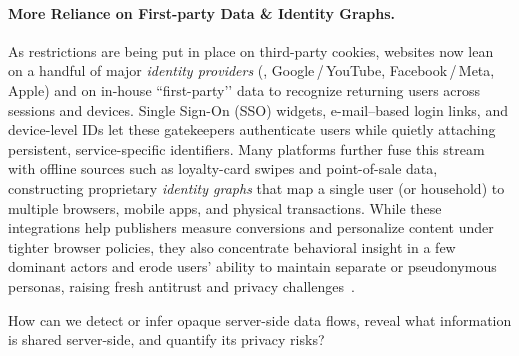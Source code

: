 \paragraph{More Reliance on First-party Data \& Identity Graphs.}
\label{sec:id-providers}
As restrictions are being put in place on third-party cookies, websites now lean on a handful of major \emph{identity providers} (\eg{}, Google\,/\,YouTube, Facebook\,/\,Meta, Apple) and on in-house ``first-party’’ data to recognize returning users across sessions and devices.
Single Sign-On (SSO) widgets, e-mail–based login links, and device-level IDs let these gatekeepers authenticate users while quietly attaching persistent, service-specific identifiers.
Many platforms further fuse this stream with offline sources such as loyalty-card swipes and point-of-sale data, constructing proprietary \emph{identity graphs} that map a single user (or household) to multiple browsers, mobile apps, and physical transactions.
%
While these integrations help publishers measure conversions and personalize content under tighter browser policies, they also concentrate behavioral insight in a few dominant actors and erode users’ ability to maintain separate or pseudonymous personas, raising fresh antitrust and privacy challenges~\cite{TargetedAdvertisingAutorite2025,khanAmazonsAntitrustParadox2017,munirGooglesChromeAntitrust2024}.

\begin{opbox}
How can we detect or infer opaque server-side data flows, reveal what information is shared server-side, and quantify its privacy risks?
\end{opbox}


